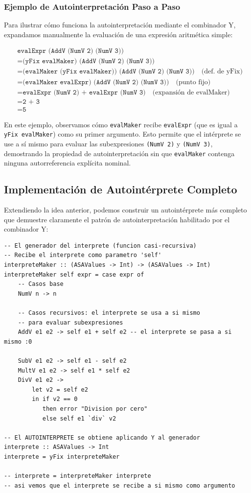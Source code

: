 \documentclass[11pt]{article}
\begin{document}
\subsubsection{Ejemplo de Autointerpretación Paso a Paso}

Para ilustrar cómo funciona la autointerpretación mediante el combinador Y, expandamos manualmente la evaluación de una expresión aritmética simple:

\begin{align*}
&\texttt{evalExpr (AddV (NumV 2) (NumV 3))} \\
&= \texttt{(yFix evalMaker) (AddV (NumV 2) (NumV 3))} \\
&= \texttt{(evalMaker (yFix evalMaker)) (AddV (NumV 2) (NumV 3))} \quad \text{(def. de yFix)} \\
&= \texttt{(evalMaker evalExpr) (AddV (NumV 2) (NumV 3))} \quad \text{(punto fijo)} \\
&= \texttt{evalExpr (NumV 2) + evalExpr (NumV 3)} \quad \text{(expansión de evalMaker)} \\
&= \texttt{2 + 3} \\
&= \texttt{5}
\end{align*}

En este ejemplo, observamos cómo \texttt{evalMaker} recibe \texttt{evalExpr} (que es igual a \texttt{yFix evalMaker}) como su primer argumento. Esto permite que el intérprete se use a sí mismo para evaluar las subexpresiones \texttt{(NumV 2)} y \texttt{(NumV 3)}, demostrando la propiedad de autointerpretación sin que \texttt{evalMaker} contenga ninguna autorreferencia explícita nominal.

\subsection{Implementación de Autointérprete Completo}

Extendiendo la idea anterior, podemos construir un autointérprete más completo que demuestre claramente el patrón de autointerpretación habilitado por el combinador Y:

\begin{lstlisting}[caption={Autointérprete con Combinador Y}]
-- El generador del interprete (funcion casi-recursiva)
-- Recibe el interprete como parametro 'self'
interpreteMaker :: (ASAValues -> Int) -> (ASAValues -> Int)
interpreteMaker self expr = case expr of
    -- Casos base
    NumV n -> n

    -- Casos recursivos: el interprete se usa a si mismo
    -- para evaluar subexpresiones
    AddV e1 e2 -> self e1 + self e2 -- el interprete se pasa a si mismo :0

    SubV e1 e2 -> self e1 - self e2
    MultV e1 e2 -> self e1 * self e2
    DivV e1 e2 ->
        let v2 = self e2
        in if v2 == 0
           then error "Division por cero"
           else self e1 `div` v2

-- El AUTOINTERPRETE se obtiene aplicando Y al generador
interprete :: ASAValues -> Int
interprete = yFix interpreteMaker

-- interprete = interpreteMaker interprete
-- asi vemos que el interprete se recibe a si mismo como argumento
\end{lstlisting}
\end{document}
